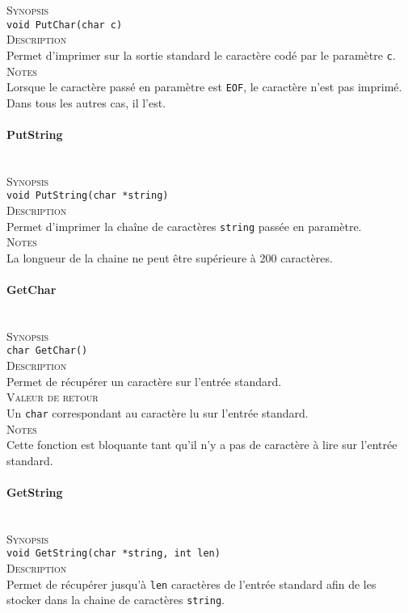 \documentclass{report}
\newcommand{\myparagraph}[1]{\paragraph*{#1}\mbox{}\\}
\begin{document}
\textsc{Synopsis}\\
	\texttt{void PutChar(char c)}\\
	
\textsc{Description}\\
	Permet d'imprimer sur la sortie standard le caractère codé par le paramètre \texttt{c}.\\
	
\textsc{Notes}\\
	Lorsque le caractère passé en paramètre est \texttt{EOF}, le caractère n'est pas imprimé. Dans tous les autres cas, il l'est.




\myparagraph{PutString}

\textsc{Synopsis}\\
	\texttt{void PutString(char *string)}\\
	
\textsc{Description}\\
	Permet d'imprimer la chaîne de caractères \texttt{string} passée en paramètre.\\
	
\textsc{Notes}\\
	La longueur de la chaine ne peut être supérieure à 200 caractères.


\myparagraph{GetChar}

\textsc{Synopsis}\\
	\texttt{char GetChar()}\\
	
\textsc{Description}\\
	Permet de récupérer un caractère sur l'entrée standard.\\
	
\textsc{Valeur de retour}\\
	Un \texttt{char} correspondant au caractère lu sur l'entrée standard.\\
	
\textsc{Notes}\\
	Cette fonction est bloquante tant qu'il n'y a pas de caractère à lire sur l'entrée standard.
	



\myparagraph{GetString}

\textsc{Synopsis}\\
	\texttt{void GetString(char *string, int len)}\\
	
\textsc{Description}\\
	Permet de récupérer jusqu'à \texttt{len} caractères de l'entrée standard afin de les stocker dans la chaine de caractères \texttt{string}.\\
	
\end{document}
